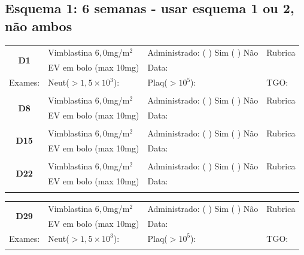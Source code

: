 \documentclass[11pt,a4paper,oldfontcommands]{memoir}
\begin{document}
\subsection{Esquema 1: 6 semanas - usar esquema 1 ou 2, não ambos}
\begin{center}
\begin{table}[H]
\begin{tabular}{p{1.3cm}p{5cm}|p{5cm}|p{3cm}}
    \hline
    \multicolumn{1}{c|}{\multirow{2}{*}{\textbf{D1}}}&{Vimblastina \(6,0\)mg/m\(^2\)}&{Administrado: (  ) Sim (  ) Não}&{Rubrica}\\
    \multicolumn{1}{c|}{}&{EV em bolo (max 10mg)}&{Data:}&\\
    \hline
    {Exames:}&{Neut(\(>1,5\times10^3\)):}&{Plaq(\(>10^5\)):}&{TGO:}
    \\
    \hline
    \\
    \hline
    \multicolumn{1}{c|}{\multirow{2}{*}{\textbf{D8}}}&{Vimblastina \(6,0\)mg/m\(^2\)}&{Administrado: (  ) Sim (  ) Não}&{Rubrica}\\
    \multicolumn{1}{c|}{}&{EV em bolo (max 10mg)}&{Data:}&\\
    \hline
    \\
    \hline
    \multicolumn{1}{c|}{\multirow{2}{*}{\textbf{D15}}}&{Vimblastina \(6,0\)mg/m\(^2\)}&{Administrado: (  ) Sim (  ) Não}&{Rubrica}\\
    \multicolumn{1}{c|}{}&{EV em bolo (max 10mg)}&{Data:}&\\
    \hline
    \\
    \hline
    \multicolumn{1}{c|}{\multirow{2}{*}{\textbf{D22}}}&{Vimblastina \(6,0\)mg/m\(^2\)}&{Administrado: (  ) Sim (  ) Não}&{Rubrica}\\
    \multicolumn{1}{c|}{}&{EV em bolo (max 10mg)}&{Data:}&\\
    \hline\\
\end{tabular}
\end{table}
\begin{table}[H]
\begin{tabular}{p{1.3cm}p{5cm}|p{5cm}|p{3cm}}
    \hline
    \multicolumn{1}{c|}{\multirow{2}{*}{\textbf{D29}}}&{Vimblastina \(6,0\)mg/m\(^2\)}&{Administrado: (  ) Sim (  ) Não}&{Rubrica}\\
    \multicolumn{1}{c|}{}&{EV em bolo (max 10mg)}&{Data:}&\\
    \hline
    {Exames:}&{Neut(\(>1,5\times10^3\)):}&{Plaq(\(>10^5\)):}&{TGO:}
    \\
    \hline\\

\end{tabular}
\end{table}
\end{center}
\end{document}
